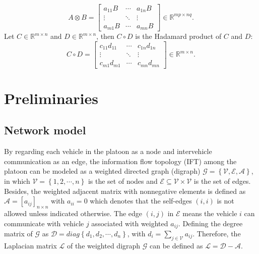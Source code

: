 \documentclass[a4paper]{cas-sc}
\begin{document}
\begin{equation*}
  A \otimes B = \left[ {\begin{array}{*{20}{c}}
          {{a_{11}}B} & \cdots & {{a_{1n}}B} \\
          \vdots      & \ddots & \vdots      \\
          {{a_{m1}}B} & \cdots & {{a_{mn}}B}
        \end{array}} \right] \in {\mathbb{R}^{mp \times nq}}.
\end{equation*}
Let $C \in {\mathbb{R}^{m \times n}} $ and $D \in {\mathbb{R}^{m \times n}} $, then $C \circ D$ is the Hadamard product of $C$ and $D$:
\begin{equation*}
  C \circ D = \left[ {\begin{array}{*{20}{c}}
          {{c_{11}}{d_{11}}} & \cdots & {{c_{1n}}{d_{1n}}} \\
          \vdots             & \ddots & \vdots             \\
          {{c_{m1}}{d_{m1}}} & \cdots & {{c_{mn}}{d_{mn}}}
        \end{array}} \right] \in {\mathbb{R}^{m \times n}}.
\end{equation*}


\section{Preliminaries}
\label{Section 2}

\subsection{Network model}
\label{Section 2.1}

By regarding each vehicle in the platoon as a node and intervehicle communication as an edge, the information flow topology (IFT) among the platoon can be modeled as a weighted directed graph (digraph) $ \mathcal{G} = \left\{ {\mathcal{V},\mathcal{E},\mathcal{A}} \right\}$, in which $\mathcal{V} = \left\{ {1,2, \cdots ,n} \right\}$ is the set of nodes and $\mathcal{E} \subseteq \mathcal{V} \times \mathcal{V} $ is the set of edges. Besides, the weighted adjacent matrix with nonnegative elements is defined as $\mathcal{A} = {[{a_{ij}}]_{n \times n}}$ with ${a_{ii}} = 0$ which denotes that the self-edges $\left( {i,i} \right)$ is not allowed unless indicated otherwise. The edge $\left( {i,j} \right)$ in $\mathcal{E}$ means the vehicle $i$ can communicate with vehicle $j$ associated with weighted ${a_{ij}}$. Defining the degree matrix of $\mathcal{G}$ as $\mathcal{D} = diag\left\{ {{d_1},{d_2}, \cdots ,{d_n}} \right\}$, with ${d_i} = \sum\limits_{j \in \mathcal{V}} {{a_{ij}}} $. Therefore, the Laplacian matrix $\mathcal{L}$ of the weighted digraph $\mathcal{G}$ can be defined as $\mathcal{L} = \mathcal{D} - \mathcal{A}$.
\end{document}
